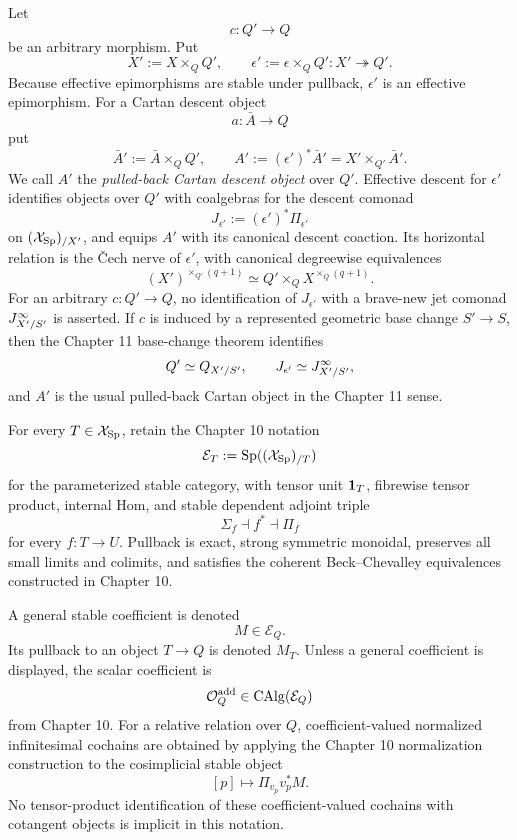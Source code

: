\begin{convention}
\label{conv:var-arbitrary-cartan-pullback}
Let
\[
    c:Q'\longrightarrow Q
\]
be an arbitrary morphism.  Put
\[
    X':=X\times_QQ',
    \qquad
    \epsilon':=\epsilon\times_QQ':X'\twoheadrightarrow Q'.
\]
Because effective epimorphisms are stable under pullback, \(\epsilon'\) is an effective epimorphism.  For a Cartan descent object
\[
    a:\bar A\longrightarrow Q
\]
put
\[
    \bar A':=\bar A\times_QQ',
    \qquad
    A':=(\epsilon')^*\bar A'
       =X'\times_{Q'}\bar A'.
\]
We call \(A'\) the \emph{pulled-back Cartan descent object} over \(Q'\).  Effective descent for \(\epsilon'\) identifies objects over \(Q'\) with coalgebras for the descent comonad
\[
    J_{\epsilon'}:=(\epsilon')^*\Pi_{\epsilon'}
\]
on \((\mathcal{X}_{\mathrm{Sp}})_{/X'}\), and equips \(A'\) with its canonical descent coaction.  Its horizontal relation is the \v{C}ech nerve of \(\epsilon'\), with canonical degreewise equivalences
\[
    (X')^{\times_{Q'}(q+1)}
    \simeq
    Q'\times_QX^{\times_Q(q+1)}.
\]
For an arbitrary \(c:Q'\to Q\), no identification of \(J_{\epsilon'}\) with a brave-new jet comonad \(J^{\infty}_{X'/S'}\) is asserted.  If \(c\) is induced by a represented geometric base change \(S'\to S\), then the Chapter 11 base-change theorem identifies
\[
    Q'\simeq Q_{X'/S'},
    \qquad
    J_{\epsilon'}\simeq J^{\infty}_{X'/S'},
\]
and \(A'\) is the usual pulled-back Cartan object in the Chapter 11 sense.
\end{convention}

\begin{convention}
\label{conv:var-stable}
For every \(T\in\mathcal{X}_{\mathrm{Sp}}\), retain the Chapter 10 notation
\[
    \mathcal E_T:=\operatorname{Sp}((\mathcal{X}_{\mathrm{Sp}})_{/T})
\]
for the parameterized stable category, with tensor unit \(\mathbf 1_T\), fibrewise tensor product, internal Hom, and stable dependent adjoint triple
\[
    \Sigma_f\dashv f^*\dashv\Pi_f
\]
for every \(f:T\to U\). Pullback is exact, strong symmetric monoidal, preserves all small limits and colimits, and satisfies the coherent Beck--Chevalley equivalences constructed in Chapter 10.
\end{convention}

\begin{convention}
\label{conv:var-coefficients}
A general stable coefficient is denoted
\[
    M\in\mathcal E_Q.
\]
Its pullback to an object \(T\to Q\) is denoted \(M_T\). Unless a general coefficient is displayed, the scalar coefficient is
\[
    \mathcal O^{\mathrm{add}}_Q\in\operatorname{CAlg}(\mathcal E_Q)
\]
from Chapter 10. For a relative relation over \(Q\), coefficient-valued normalized infinitesimal cochains are obtained by applying the Chapter 10 normalization construction to the cosimplicial stable object
\[
    [p]\longmapsto\Pi_{v_p}v_p^*M.
\]
No tensor-product identification of these coefficient-valued cochains with cotangent objects is implicit in this notation.
\end{convention}


